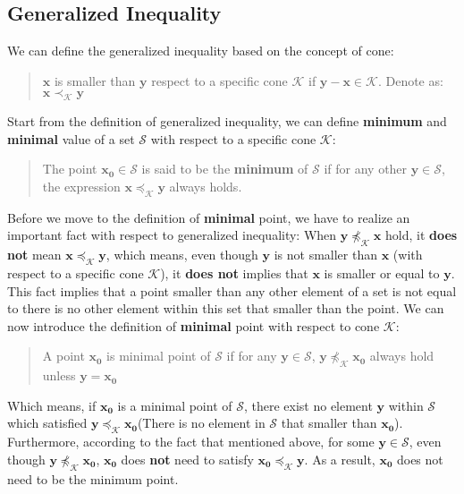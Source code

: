 \documentclass[10pt,a4paper]{article}
\begin{document}
\subsection{Generalized Inequality}
We can define the generalized inequality based on the concept of cone:
\begin{quote}
	$\mathbf{x}$ is smaller than $\mathbf{y}$ respect to a specific cone $\mathcal{K}$ if  $\mathbf{y} - \mathbf{x} \in \mathcal{K}$. Denote as: $\mathbf{x} \prec_{\mathcal{K}} \mathbf{y}$
\end{quote}
Start from the definition of generalized inequality, we can define \textbf{minimum} and \textbf{minimal} value of a set $\mathcal{S}$ with respect to a specific cone $\mathcal{K}$:
\begin{quote}
	The point $\mathbf{x_{0}} \in \mathcal{S}$ is said to be the \textbf{minimum} of $\mathcal{S}$ if for any other $\mathbf{y} \in \mathcal{S}$, the expression $\mathbf{x} \preceq_{\mathcal{K}} \mathbf{y}$ always holds.
\end{quote}
Before we move to the definition of \textbf{minimal} point, we have to realize an important fact with respect to generalized inequality: When $\mathbf{y} \npreceq_{\mathcal{K}} \mathbf{x}$ hold, it \textbf{does not} mean $\mathbf{x} \preceq_{\mathcal{K}} \mathbf{y}$, which means, even though $\mathbf{y}$ is not smaller than $\mathbf{x}$ (with respect to a specific cone $\mathcal{K}$), it \textbf{does not} implies that $\mathbf{x}$ is smaller or equal to $\mathbf{y}$. This fact implies that a point smaller than any other element of a set is not equal to there is no other element within this set that smaller than the point. We can now introduce the definition of \textbf{minimal} point with respect to cone $\mathcal{K}$:
\begin{quote}
	A point $\mathbf{x_{0}}$ is minimal point of $\mathcal{S}$ if for any $\mathbf{y} \in \mathcal{S}$, $\mathbf{y} \npreceq_{\mathcal{K}} \mathbf{x_{0}}$ always hold unless $\mathbf{y} = \mathbf{x_{0}}$ 
\end{quote}
Which means, if $\mathbf{x_{0}}$ is a minimal point of $\mathcal{S}$, there exist no element $\mathbf{y}$ within $\mathcal{S}$ which satisfied $\mathbf{y} \preceq_{\mathcal{K}} \mathbf{x_{0}}$(There is no element in $\mathcal{S}$ that smaller than $\mathbf{x_{0}}$). Furthermore, according to the fact that mentioned above, for some $\mathbf{y} \in \mathcal{S}$, even though $\mathbf{y} \npreceq_{\mathcal{K}} \mathbf{x_{0}}$, $\mathbf{x_{0}}$ does \textbf{not} need to satisfy $\mathbf{x_{0}} \preceq_{\mathcal{K}} \mathbf{y}$. As a result, $\mathbf{x_{0}}$ does not need to be the minimum point.
\end{document}
